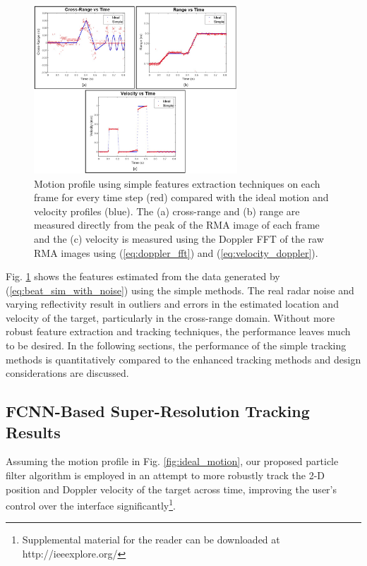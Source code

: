 \documentclass[10pt,journal,final]{IEEEtran}
\begin{document}
\begin{figure}[h]
	\centering
	\includegraphics[width=3in]{simple_motion.jpg}
	\caption{Motion profile using simple features extraction techniques on each frame for every time step (red) compared with the ideal motion and velocity profiles (blue). The (a) cross-range and (b) range are measured directly from the peak of the RMA image of each frame and the (c) velocity is measured using the Doppler FFT of the raw RMA images using (\ref{eq:doppler_fft}) and (\ref{eq:velocity_doppler}).}
	\label{fig:simple_motion}
\end{figure}

Fig. \ref{fig:simple_motion} shows the features estimated from the data generated by (\ref{eq:beat_sim_with_noise}) using the simple methods. 
The real radar noise and varying reflectivity result in outliers and errors in the estimated location and velocity of the target, particularly in the cross-range domain.
Without more robust feature extraction and tracking techniques, the performance leaves much to be desired.
In the following sections, the performance of the simple tracking methods is quantitatively compared to the enhanced tracking methods and design considerations are discussed.

\subsection{FCNN-Based Super-Resolution Tracking Results}
\label{subsec:enhanced_gesture_tracking_results}
Assuming the motion profile in Fig. \ref{fig:ideal_motion}, our proposed particle filter algorithm is employed in an attempt to more robustly track the 2-D position and Doppler velocity of the target across time, improving the user's control over the interface significantly\footnote{Supplemental material for the reader can be downloaded at http://ieeexplore.org/}.
\end{document}
